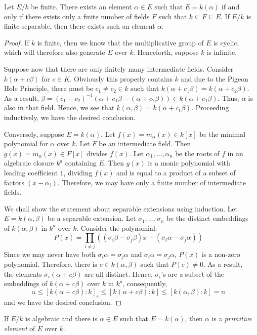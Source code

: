 \begin{theorem}
    Let $E/k$ be finite. There exists an element $\alpha\in E$ such that $E = k(\alpha)$ if and only if there exists only a finite number of fields $F$ such that $k\subseteq F\subseteq E$. If $E/k$ is finite separable, then there exists such an element $\alpha$.
\end{theorem}
\begin{proof}
    If $k$ is finite, then we know that the multiplicative group of $E$ is cyclic, which will therefore also generate $E$ over $k$. Henceforth, suppose $k$ is infinite.

    Suppose now that there are only finitely many intermediate fields. Consider $k(\alpha + c\beta)$ for $c\in K$. Obviously this properly contains $k$ and due to the Pigeon Hole Principle, there must be $c_1\ne c_2\in k$ such that $k(\alpha + c_1\beta) = k(\alpha + c_2\beta)$. As a result, $\beta = (c_1 - c_2)^{-1}(\alpha + c_1\beta - (\alpha + c_2\beta))\in k(\alpha + c_1\beta)$. Thus, $\alpha$ is also in that field. Hence, we see that $k(\alpha,\beta) = k(\alpha + c_1\beta)$. Proceeding inductively, we have the desired conclusion.

    Conversely, suppose $E = k(\alpha)$. Let $f(x) = m_\alpha(x)\in k[x]$ be the minimal polynomial for $\alpha$ over $k$. Let $F$ be an intermediate field. Then $g(x) = m_\alpha(x)\in F[x]$ divides $f(x)$. Let $\alpha_1,\ldots,\alpha_n$ be the roots of $f$ in an algebraic closure $k^a$ containing $E$. Then $g(x)$ is a monic polynomial with leading coefficient $1$, dividing $f(x)$ and is equal to a product of a subset of factors $(x - \alpha_i)$. Therefore, we may have only a finite number of intermediate fields.

    We shall show the statement about separable extensions using induction. Let $E = k(\alpha,\beta)$ be a separable extension. Let $\sigma_1,\ldots,\sigma_n$ be the distinct embeddings of $k(\alpha,\beta)$ in $k^a$ over $k$. Consider the polynomial: 
    \begin{equation*}
        P(x) = \prod_{i\ne j}\left((\sigma_i\beta - \sigma_j\beta)x + (\sigma_i\alpha - \sigma_j\alpha)\right)
    \end{equation*}
    Since we may never have both $\sigma_i\alpha = \sigma_j\alpha$ and $\sigma_i\alpha = \sigma_j\alpha$, $P(x)$ is a non-zero polynomial. Therefore, there is $c\in k(\alpha,\beta)$ such that $P(c)\ne 0$. As a result, the elements $\sigma_i(\alpha + c\beta)$ are all distinct. Hence, $\sigma_i$'s are a subset of the embeddings of $k(\alpha + c\beta)$ over $k$ in $k^a$, consequently, 
    \begin{equation*}
        n\le [k(\alpha + c\beta):k]_s\le[k(\alpha + c\beta):k]\le[k(\alpha,\beta):k] = n
    \end{equation*}
    and we have the desired conclusion.
\end{proof}

\begin{definition}
    If $E/k$ is algebraic and there is $\alpha\in E$ such that $E = k(\alpha)$, then $\alpha$ is a \textit{primitive element} of $E$ over $k$.
\end{definition}